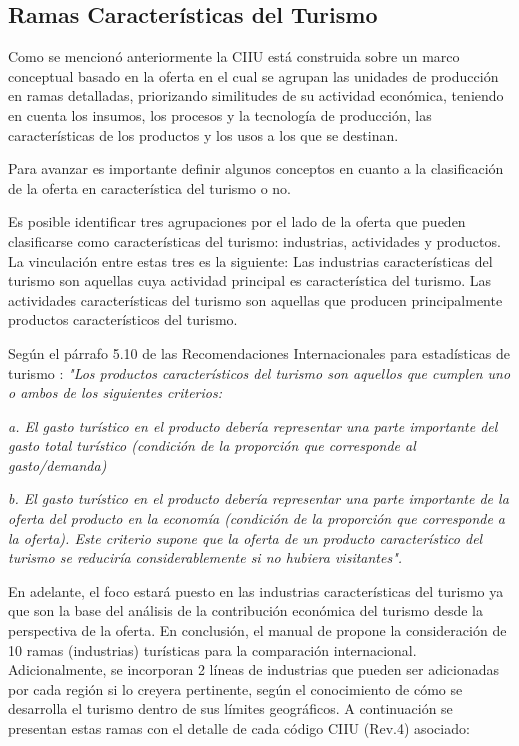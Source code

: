 \documentclass[
  openany]{book}
\begin{document}
\hypertarget{ramas-caracteruxedsticas-del-turismo}{%
\subsection{Ramas Características del Turismo}\label{ramas-caracteruxedsticas-del-turismo}}

Como se mencionó anteriormente la CIIU está construida sobre un marco conceptual basado en la oferta en el cual se agrupan las unidades de producción en ramas detalladas, priorizando similitudes de su actividad económica, teniendo en cuenta los insumos, los procesos y la tecnología de producción, las características de los productos y los usos a los que se destinan.

Para avanzar es importante definir algunos conceptos en cuanto a la clasificación de la oferta en característica del turismo o no.

Es posible identificar tres agrupaciones por el lado de la oferta que pueden clasificarse como características del turismo: industrias, actividades y productos. La vinculación entre estas tres es la siguiente: Las industrias características del turismo son aquellas cuya actividad principal es característica del turismo. Las actividades características del turismo son aquellas que producen principalmente productos característicos del turismo.

Según el párrafo 5.10 de las Recomendaciones Internacionales para estadísticas de turismo \citep{riet2008}: \emph{"Los productos característicos del turismo son aquellos que cumplen uno o ambos de los siguientes criterios:}

\emph{a. El gasto turístico en el producto debería representar una parte importante del gasto total turístico (condición de la proporción que corresponde al gasto/demanda)}

\emph{b. El gasto turístico en el producto debería representar una parte importante de la oferta del producto en la economía (condición de la proporción que corresponde a la oferta). Este criterio supone que la oferta de un producto característico del turismo se reduciría considerablemente si no hubiera visitantes".}

En adelante, el foco estará puesto en las industrias características del turismo ya que son la base del análisis de la contribución económica del turismo desde la perspectiva de la oferta. En conclusión, el manual de \citet{cstrmc2008} propone la consideración de 10 ramas (industrias) turísticas para la comparación internacional. Adicionalmente, se incorporan 2 líneas de industrias que pueden ser adicionadas por cada región si lo creyera pertinente, según el conocimiento de cómo se desarrolla el turismo dentro de sus límites geográficos. A continuación se presentan estas ramas con el detalle de cada código CIIU (Rev.4) asociado:
\end{document}
